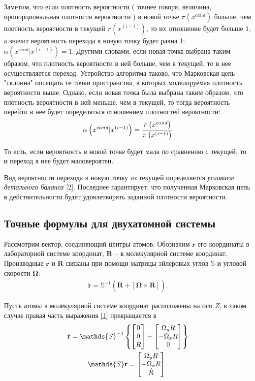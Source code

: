 \documentclass[12pt]{article}
\newcommand{\lb}{\left(}
\newcommand{\rb}{\right)}
\newcommand{\mf}{\mathbf}
\newcommand{\bbS}{\mathds{S}}
\begin{document}
Заметим, что если плотность вероятности ( точнее говоря, величина, пропорциональная плотности вероятности ) в новой точке $\pi \lb x^{cand} \rb$ больше, чем плотность вероятности в текущей $\pi \lb x^{\lb i - 1 \rb} \rb$, то их отношение будет больше $1$, а значит вероятность перехода в новую точку будет равна 1: $\alpha \lb x^{cand} | x^{(i - 1)} \rb = 1$. Другими словами, если новая точка выбрана таким образом, что плотность вероятности в ней больше, чем в текущей, то в нее осуществляется переход. Устройство алгоритма таково, что Марковская цепь "склонна" посещать те точки пространства, в которых моделируемая плотность вероятности выше. Однако, если новая точка была выбрана таким образом, что плотность вероятности в ней меньше, чем в текущей, то тогда вероятность перейти в нее будет определяться отношением плотностей вероятности:
\begin{gather}
		\alpha \lb x^{cand} | x^{(i - 1)} \rb = \frac{\pi \lb x^{cand} \rb}{\pi \lb x^{(i - 1)} \rb} \notag
\end{gather}

То есть, если вероятность в новой точке будет мала по сравнению с текущей, то и переход в нее будет маловероятен. \par
Вид вероятности перехода в новую точку из текущей определяется \textit{условием детального баланса} [2]. Последнее гарантирует, что полученная Марковская цепь в действительности будет удовлетворять заданной плотности вероятности.

\subsection{Точные формулы для двухатомной системы}

Рассмотрим вектор, соединяющий центры атомов. Обозначим $\mf{r}$ его координаты в лабораторной системе координат, $\mf{R}$ -- в молекулярной системе координат. Производные $\mf{r}$ и $\mf{R}$ связаны при помощи матрицы эйлеровых углов $\bbS$ и угловой скорости $\mf{\Omega}$:
\begin{gather}
		\dot{\mf{r}} = \bbS^{-1} \lb \dot{\mf{R}} + \left[ \mf{\Omega} \times \mf{R} \right] \rb. \label{1} 
\end{gather}

Пусть атомы в молекулярной системе координат расположены на оси $Z$, в таком случае правая часть выражения \eqref{1} превращается в 
\begin{gather}
\dot{\mf{r}} = \bbS^{-1} \left\{
\begin{bmatrix}
		0 \\
		0 \\
		\dot{R}
\end{bmatrix}
+
\begin{bmatrix}
		\Omega_y R \\
		- \Omega_x R \\
		0
\end{bmatrix}
\right\} \notag \\
\bbS \dot{\mf{r}} =
\begin{bmatrix}
\Omega_y R \\
- \Omega_x R \\
\dot{R}
\end{bmatrix}. \label{2}
\end{gather}
\end{document}
